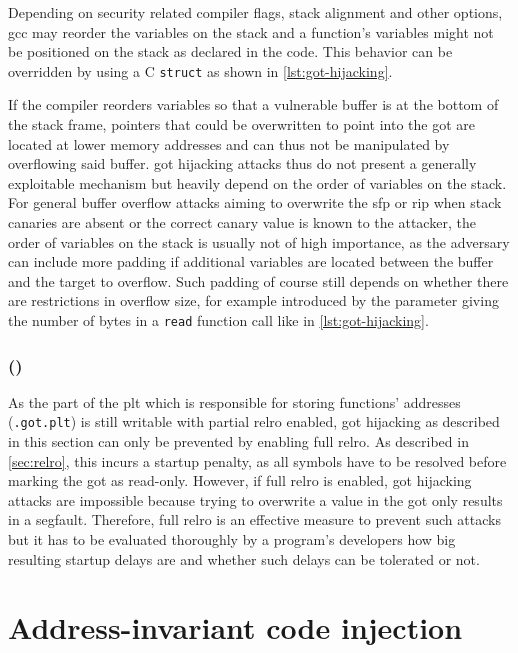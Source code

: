 Depending on security related compiler flags, stack alignment and other options, \gls{gcc} may reorder the variables on the stack and a function's variables might not be positioned on the stack as declared in the code.
This behavior can be overridden by using a C \texttt{struct} as shown in \cref{lst:got-hijacking}.

If the compiler reorders variables so that a vulnerable buffer is at the bottom of the stack frame, pointers that could be overwritten to point into the \gls{got} are located at lower memory addresses and can thus not be manipulated by overflowing said buffer.
\gls{got} hijacking attacks thus do not present a generally exploitable mechanism but heavily depend on the order of variables on the stack.
For general buffer overflow attacks aiming to overwrite the \gls{sfp} or \gls{rip} when stack canaries are absent or the correct canary value is known to the attacker, the order of variables on the stack is usually not of high importance, as the adversary can include more padding if additional variables are located between the buffer and the target to overflow.
Such padding of course still depends on whether there are restrictions in overflow size, for example introduced by the parameter giving the number of bytes in a \texttt{read} function call like in \cref{lst:got-hijacking}.

\subsubsection{ ()}
\label{subsubsec:got-relro}

As the part of the \gls{plt} which is responsible for storing functions' addresses (\texttt{.got.plt}) is still writable with partial \gls{relro} enabled, \gls{got} hijacking as described in this section can only be prevented by enabling full \gls{relro}.
As described in \cref{sec:relro}, this incurs a startup penalty, as all symbols have to be resolved before marking the \gls{got} as read-only.
However, if full \gls{relro} is enabled, \gls{got} hijacking attacks are impossible because trying to overwrite a value in the \gls{got} only results in a \gls{segfault}.
Therefore, full \gls{relro} is an effective measure to prevent such attacks but it has to be evaluated thoroughly by a program's developers how big resulting startup delays are and whether such delays can be tolerated or not.

\section{Address-invariant code injection}
\label{sec:address-invariant-code-injection}

